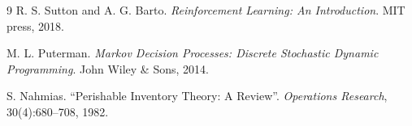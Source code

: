 \documentclass{article}
\begin{document}
\begin{thebibliography}{9}
R. S. Sutton and A. G. Barto. \textit{Reinforcement Learning: An Introduction}. MIT press, 2018.

M. L. Puterman. \textit{Markov Decision Processes: Discrete Stochastic Dynamic Programming}. John Wiley \& Sons, 2014.

S. Nahmias. ``Perishable Inventory Theory: A Review''. \textit{Operations Research}, 30(4):680--708, 1982.
\end{thebibliography}
\end{document}
